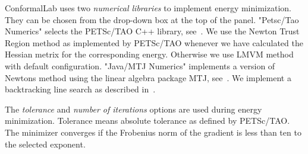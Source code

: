 \documentclass[Thesis.tex]{subfiles}
\begin{document}
{\sc ConformalLab} uses two \emph{numerical libraries} to implement energy minimization. 
They can be chosen from the drop-down box at the top of the panel. 
"Petsc/Tao Numerics" selects the {\sc PETSc/TAO} C++ library, see~\cite{petsc-web-page, tao-user-ref}. 
We use the Newton Trust Region method as implemented by {\sc PETSc/TAO} whenever we have calculated the Hessian metrix for the corresponding energy. 
Otherwise we use  LMVM method with default configuration. 
"Java/MTJ Numerics" implements a version of Newtons method using the linear algebra package MTJ, see~\cite{mtj-website}. 
We implement a backtracking line search as described in~\cite[pp.~464]{boyd2004convex}.

The \emph{tolerance} and \emph{number of iterations} options are used during energy minimization. 
Tolerance means absolute tolerance as defined by {\sc PETSc/TAO}. 
The minimizer converges if the Frobenius norm of the gradient is less than ten to the selected exponent.

\subfilebibliography
\end{document}
